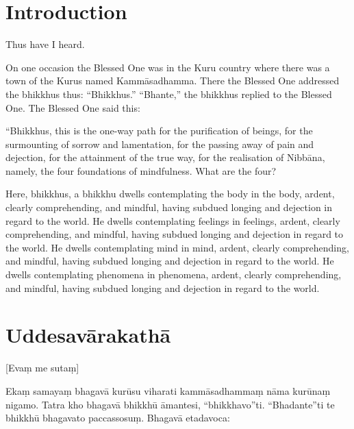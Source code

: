 \newcommand\englishPage{%
  \clearpage%
  \englishText%
}

\newcommand\paliPage{%
  \clearpage%
  \paliText%
}

\renewcommand{\englishTitle}{The Foundations of Mindfulness}
\renewcommand{\paliTitle}{Mahāsatipaṭṭhāna Sutta}

\englishPage
\chapter{Introduction}

Thus have I heard.

On one occasion the Blessed One was in the Kuru country where there was a town
of the Kurus named Kammāsadhamma. There the Blessed One addressed the bhikkhus
thus: “Bhikkhus.” “Bhante,” the bhikkhus replied to the Blessed One. The Blessed
One said this:

“Bhikkhus, this is the one-way path for the purification of beings, for the
surmounting of sorrow and lamentation, for the passing away of pain and
dejection, for the attainment of the true way, for the realisation of Nibbāna,
namely, the four foundations of mindfulness. What are the four?

Here, bhikkhus, a bhikkhu dwells contemplating the body in the body, ardent,
clearly comprehending, and mindful, having subdued longing and dejection in
regard to the world. He dwells contemplating feelings in feelings, ardent,
clearly comprehending, and mindful, having subdued longing and dejection in
regard to the world. He dwells contemplating mind in mind, ardent, clearly
comprehending, and mindful, having subdued longing and dejection in regard to
the world. He dwells contemplating phenomena in phenomena, ardent, clearly
comprehending, and mindful, having subdued longing and dejection in regard to
the world.


\paliPage
\chapter*{Uddesavārakathā}

[Evaṃ me sutaṃ]

Ekaṃ samayaṃ bhagavā kurūsu viharati kammāsadhammaṃ nāma kurūnaṃ nigamo. Tatra
kho bhagavā bhikkhū āmantesi, “bhikkhavo”ti. “Bhadante”ti te bhikkhū bhagavato
paccassosuṃ. Bhagavā etadavoca:

